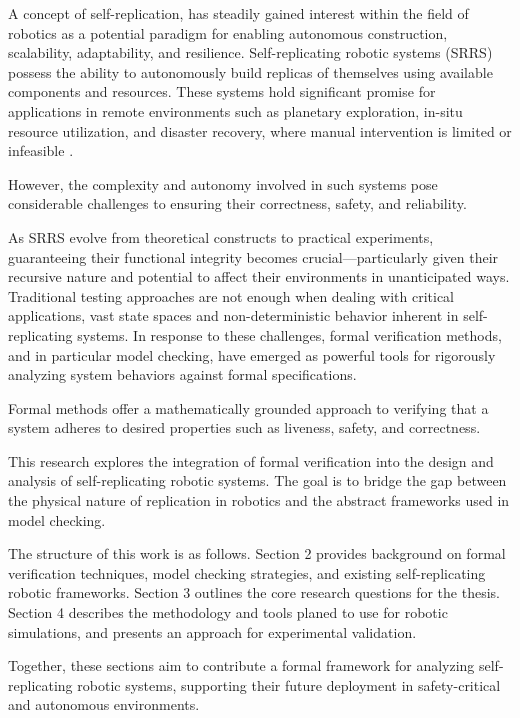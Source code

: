 A concept of self-replication, has steadily 
gained interest within the field of robotics as a potential paradigm for enabling 
autonomous construction, scalability, adaptability, and resilience. Self-replicating 
robotic systems (SRRS) possess the ability to autonomously build replicas of 
themselves using available components and resources. These systems hold significant 
promise for applications in remote environments such as planetary exploration,
in-situ resource utilization, and disaster recovery, where manual intervention 
is limited or infeasible \cite{Suthakorn2002SpaceUtilization} \cite{Nasa1980ConferencePublication}.

However, the complexity and autonomy involved in such 
systems pose considerable challenges to ensuring their correctness, safety, and reliability.

As SRRS evolve from theoretical constructs to practical experiments, guaranteeing 
their functional integrity becomes crucial—particularly given their recursive 
nature and potential to affect their environments in unanticipated ways. 
Traditional testing approaches are not enough when dealing with critical 
applications, vast state spaces and non-deterministic behavior inherent 
in self-replicating systems. In response to these challenges, 
formal verification methods, and in particular model checking,
have emerged as powerful tools for rigorously analyzing system behaviors against 
formal specifications.

Formal methods offer a mathematically grounded approach to verifying that a 
system adheres to desired properties such as liveness, safety, 
and correctness. 

This research explores the integration of formal verification into the design 
and analysis of self-replicating robotic systems. The goal is to bridge the 
gap between the physical nature of replication in robotics and the 
abstract frameworks used in model checking. 

The structure of this work is as follows. Section 2 provides background on formal 
verification techniques, model checking strategies, and existing self-replicating 
robotic frameworks. Section 3 outlines the core research questions for the thesis.
Section 4 describes the methodology and tools planed to use
for robotic simulations, and presents an approach for experimental validation. 

Together, these sections aim to contribute a formal 
framework for analyzing self-replicating robotic systems, supporting their future 
deployment in safety-critical and autonomous environments.
